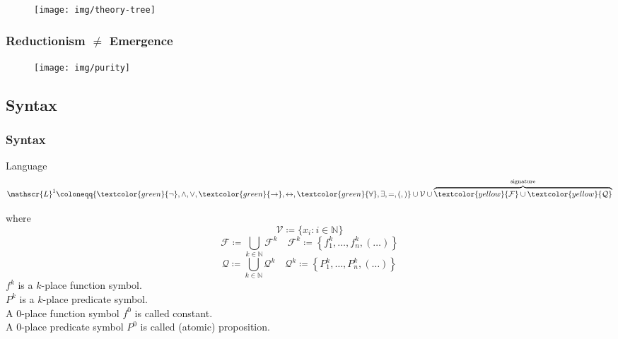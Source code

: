 \documentclass[UTF8,11pt,colorlinks,compress,openany]{beamer}%
\begin{document}
\begin{frame}\frametitle{}
	\begin{figure}
		\colorbox{green!15}{\texttt{[image: img/theory-tree]}}
	\end{figure}
\end{frame}

\begin{frame}\frametitle{Reductionism $\ne$ Emergence}
	\begin{figure}
		\texttt{[image: img/purity]}
	\end{figure}
\end{frame}

\subsection{Syntax}

\begin{frame}\frametitle{Syntax}
		\begin{block}{Language}
			\[\mathscr{L}^1\coloneqq \{\textcolor{green}{\neg},\wedge,\vee,\textcolor{green}{\to},\leftrightarrow,\textcolor{green}{\forall},\exists,=,(,)\}\cup\mathcal{V}\cup\overbrace{\textcolor{yellow}{\mathcal{F}}\cup\textcolor{yellow}{\mathcal{Q}}}^{\text{signature}}\]
		\end{block}
		where
		\[\mathcal{V}\coloneqq \{x_i: i\in\mathbb{N}\}\]
		\[\mathcal{F}\coloneqq \bigcup\limits_{k\in\mathbb{N}}\mathcal{F}^k\quad \mathcal{F}^k\coloneqq \left\{f_1^k,\dots,f_n^k,(\dots)\right\}\]
		\[\mathcal{Q}\coloneqq \bigcup\limits_{k\in\mathbb{N}}\mathcal{Q}^k\quad \mathcal{Q}^k\coloneqq \left\{P_1^k,\dots,P_n^k,(\dots)\right\}\]
		$f^k$ is a $k$-place function symbol.\\
		$P^k$ is a $k$-place predicate symbol.\\
		A $0$-place function symbol $f^0$ is called constant.\\
		A $0$-place predicate symbol $P^0$ is called (atomic) proposition.
\end{frame}
\end{document}
